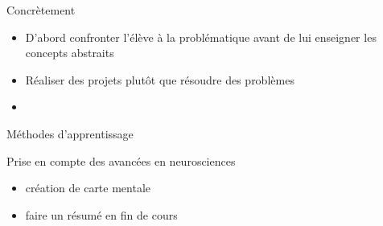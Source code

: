 \begin{frame}{Concrètement}
\begin{itemize}
  \item D'abord confronter l'élève à la problématique avant de lui enseigner les concepts abstraits
  \item Réaliser des projets plutôt que résoudre des problèmes
  \item 
\end{itemize}
\end{frame}

\begin{frame}{Méthodes d'apprentissage}
  \begin{block}{Prise en compte des avancées en neurosciences}
    \begin{itemize}
    \item création de carte mentale
    \item faire un résumé en fin de cours
    \end{itemize}
  \end{block}


\end{frame}